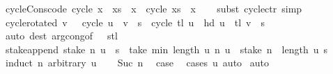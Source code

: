 \begin{isabellebody}
\isamarkupfalse%
%
\endisatagproof
{\isafoldproof}%
%
\isadelimproof
\isanewline
%
\endisadelimproof
\isanewline
{}\isamarkupfalse%
\ cycle{\isacharunderscore}Cons{\isacharbrackleft}code{\isacharbrackright}{\isacharcolon}\ {\isachardoublequoteopen}cycle\ {\isacharparenleft}x\ {\isacharhash}\ xs{\isacharparenright}\ {\isacharequal}\ x\ {\isacharhash}{\isacharhash}\ cycle\ {\isacharparenleft}xs\ {\isacharat}\ {\isacharbrackleft}x{\isacharbrackright}{\isacharparenright}{\isachardoublequoteclose}\isanewline
%
\isadelimproof
\ \ %
\endisadelimproof
%
\isatagproof
{}\isamarkupfalse%
\ {\isacharparenleft}subst\ cycle{\isachardot}ctr{\isacharparenright}\ simp%
\endisatagproof
{\isafoldproof}%
%
\isadelimproof
\isanewline
%
\endisadelimproof
\isanewline
{}\isamarkupfalse%
\ cycle{\isacharunderscore}rotated{\isacharcolon}\ {\isachardoublequoteopen}{\isasymlbrakk}v\ {\isasymnoteq}\ {\isacharbrackleft}{\isacharbrackright}{\isacharsemicolon}\ cycle\ u\ {\isacharequal}\ v\ {\isacharat}{\isacharminus}\ s{\isasymrbrakk}\ {\isasymLongrightarrow}\ cycle\ {\isacharparenleft}tl\ u\ {\isacharat}\ {\isacharbrackleft}hd\ u{\isacharbrackright}{\isacharparenright}\ {\isacharequal}\ tl\ v\ {\isacharat}{\isacharminus}\ s{\isachardoublequoteclose}\isanewline
%
\isadelimproof
\ \ %
\endisadelimproof
%
\isatagproof
{}\isamarkupfalse%
\ {\isacharparenleft}auto\ dest{\isacharcolon}\ arg{\isacharunderscore}cong{\isacharbrackleft}of\ {\isacharunderscore}\ {\isacharunderscore}\ stl{\isacharbrackright}{\isacharparenright}%
\endisatagproof
{\isafoldproof}%
%
\isadelimproof
\isanewline
%
\endisadelimproof
\isanewline
{}\isamarkupfalse%
\ stake{\isacharunderscore}append{\isacharcolon}\ {\isachardoublequoteopen}stake\ n\ {\isacharparenleft}u\ {\isacharat}{\isacharminus}\ s{\isacharparenright}\ {\isacharequal}\ take\ {\isacharparenleft}min\ {\isacharparenleft}length\ u{\isacharparenright}\ n{\isacharparenright}\ u\ {\isacharat}\ stake\ {\isacharparenleft}n\ {\isacharminus}\ length\ u{\isacharparenright}\ s{\isachardoublequoteclose}\isanewline
%
\isadelimproof
%
\endisadelimproof
%
\isatagproof
{}\isamarkupfalse%
\ {\isacharparenleft}induct\ n\ arbitrary{\isacharcolon}\ u{\isacharparenright}\isanewline
\ \ \isamarkupfalse%
\ {\isacharparenleft}Suc\ n{\isacharparenright}\ \isamarkupfalse%
\ {\isacharquery}case\ \isamarkupfalse%
\ {\isacharparenleft}cases\ u{\isacharparenright}\ auto\isanewline
{}\isamarkupfalse%
\ auto%
\endisatagproof

\end{isabellebody}
